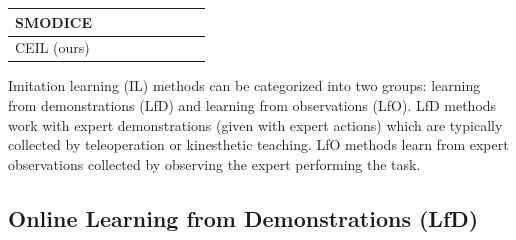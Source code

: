 \begin{table}[t]
{\begin{tabular}{lccccccc}
			SMODICE~\citep{ma2022smodice}
			& {\scriptsize \CheckmarkBold} & {\scriptsize \CheckmarkBold} & {\scriptsize \textcolor{minetable1colorx}{\XSolidBrush}} & {\scriptsize \CheckmarkBold} & {\scriptsize \CheckmarkBold} \\
			\toprule
			CEIL (ours)  
			& {\scriptsize \CheckmarkBold} & {\scriptsize \CheckmarkBold} & {\scriptsize \CheckmarkBold} & {\scriptsize \CheckmarkBold} & {\scriptsize \CheckmarkBold}   \\
			\bottomrule
		\end{tabular}%
			}
\end{table}%





Imitation learning (IL) methods can be categorized into two groups: learning from demonstrations (LfD) and learning from observations (LfO). LfD methods work with expert demonstrations (given with expert actions) which are typically collected by teleoperation or kinesthetic teaching. LfO methods learn from expert observations collected by observing the expert performing the task. 

\subsection{Online Learning from Demonstrations (LfD)}

